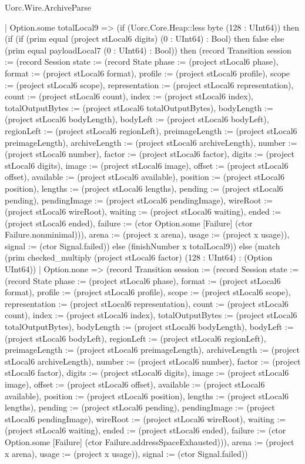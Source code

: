 \begin{lexlean}{Uorc.Wire.ArchiveParse}
\begin{semanticmodule}
{      | Option.some totalLocal9 => (if (Uorc.Core.Heap::less byte (128 : UInt64)) then (if (if (prim equal (project stLocal6 digits) (0 : UInt64) : Bool) then false else (prim equal payloadLocal7 (0 : UInt64) : Bool)) then (record Transition {session := (record Session {state := (record State {phase := (project stLocal6 phase), format := (project stLocal6 format), profile := (project stLocal6 profile), scope := (project stLocal6 scope), representation := (project stLocal6 representation), count := (project stLocal6 count), index := (project stLocal6 index), totalOutputBytes := (project stLocal6 totalOutputBytes), bodyLength := (project stLocal6 bodyLength), bodyLeft := (project stLocal6 bodyLeft), regionLeft := (project stLocal6 regionLeft), preimageLength := (project stLocal6 preimageLength), archiveLength := (project stLocal6 archiveLength), number := (project stLocal6 number), factor := (project stLocal6 factor), digits := (project stLocal6 digits), image := (project stLocal6 image), offset := (project stLocal6 offset), available := (project stLocal6 available), position := (project stLocal6 position), lengths := (project stLocal6 lengths), pending := (project stLocal6 pending), pendingImage := (project stLocal6 pendingImage), wireRoot := (project stLocal6 wireRoot), waiting := (project stLocal6 waiting), ended := (project stLocal6 ended), failure := (ctor Option.some [Failure] (ctor Failure.nonminimal))}), arena := (project x arena), usage := (project x usage)}), signal := (ctor Signal.failed)}) else (finishNumber x totalLocal9)) else (match (prim checked_multiply (project stLocal6 factor) (128 : UInt64) : (Option UInt64))
        | Option.none => (record Transition {session := (record Session {state := (record State {phase := (project stLocal6 phase), format := (project stLocal6 format), profile := (project stLocal6 profile), scope := (project stLocal6 scope), representation := (project stLocal6 representation), count := (project stLocal6 count), index := (project stLocal6 index), totalOutputBytes := (project stLocal6 totalOutputBytes), bodyLength := (project stLocal6 bodyLength), bodyLeft := (project stLocal6 bodyLeft), regionLeft := (project stLocal6 regionLeft), preimageLength := (project stLocal6 preimageLength), archiveLength := (project stLocal6 archiveLength), number := (project stLocal6 number), factor := (project stLocal6 factor), digits := (project stLocal6 digits), image := (project stLocal6 image), offset := (project stLocal6 offset), available := (project stLocal6 available), position := (project stLocal6 position), lengths := (project stLocal6 lengths), pending := (project stLocal6 pending), pendingImage := (project stLocal6 pendingImage), wireRoot := (project stLocal6 wireRoot), waiting := (project stLocal6 waiting), ended := (project stLocal6 ended), failure := (ctor Option.some [Failure] (ctor Failure.addressSpaceExhausted))}), arena := (project x arena), usage := (project x usage)}), signal := (ctor Signal.failed)})
}
\end{semanticmodule}
\end{lexlean}
